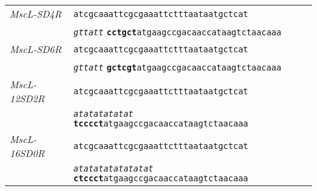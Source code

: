 \begin{longtable}[]{@{}ll@{}}
\begin{minipage}[t]{0.27\columnwidth}
\emph{MscL-SD4R}\strut
\end{minipage}
&
\begin{minipage}[t]{0.67\columnwidth}\raggedright\strut
\texttt{atcgcaaattcgcgaaattctttaataatgctcat}\strut
\end{minipage}\tabularnewline
\begin{minipage}[t]{0.27\columnwidth}\raggedright\strut
\strut
\end{minipage}
&
\begin{minipage}[t]{0.67\columnwidth}\raggedright\strut
\emph{\texttt{gttatt}}
\textbf{\texttt{cctgct}}\texttt{atgaagccgacaaccataagtctaacaaa}\strut
\end{minipage}\tabularnewline
\begin{minipage}[t]{0.27\columnwidth}\raggedright\strut
\emph{MscL-SD6R}\strut
\end{minipage}
&
\begin{minipage}[t]{0.67\columnwidth}\raggedright\strut
\texttt{atcgcaaattcgcgaaattctttaataatgctcat}\strut
\end{minipage}\tabularnewline
\begin{minipage}[t]{0.27\columnwidth}\raggedright\strut
\strut
\end{minipage}
&
\begin{minipage}[t]{0.67\columnwidth}\raggedright\strut
\emph{\texttt{gttatt}}
\textbf{\texttt{gctcgt}}\texttt{atgaagccgacaaccataagtctaacaaa}\strut
\end{minipage}\tabularnewline
\begin{minipage}[t]{0.27\columnwidth}\raggedright\strut
\emph{MscL-12SD2R}\strut
\end{minipage}
&
\begin{minipage}[t]{0.67\columnwidth}\raggedright\strut
\texttt{atcgcaaattcgcgaaattctttaataatgctcat}\strut
\end{minipage}\tabularnewline
\begin{minipage}[t]{0.27\columnwidth}\raggedright\strut
\strut
\end{minipage}
&
\begin{minipage}[t]{0.67\columnwidth}\raggedright\strut
\emph{\texttt{atatatatatat}}
\textbf{\texttt{tcccct}}\texttt{atgaagccgacaaccataagtctaacaaa}\strut
\end{minipage}\tabularnewline
\begin{minipage}[t]{0.27\columnwidth}\raggedright\strut
\emph{MscL-16SD0R}\strut
\end{minipage}
&
\begin{minipage}[t]{0.67\columnwidth}\raggedright\strut
\texttt{atcgcaaattcgcgaaattctttaataatgctcat}\strut
\end{minipage}\tabularnewline
\begin{minipage}[t]{0.27\columnwidth}\raggedright\strut
\strut
\end{minipage}
&
\begin{minipage}[t]{0.67\columnwidth}\raggedright\strut
\emph{\texttt{atatatatatatatat}}
\textbf{\texttt{ctccct}}\texttt{atgaagccgacaaccataagtctaacaaa}\strut
\end{minipage}\tabularnewline
\bottomrule
\end{longtable}

